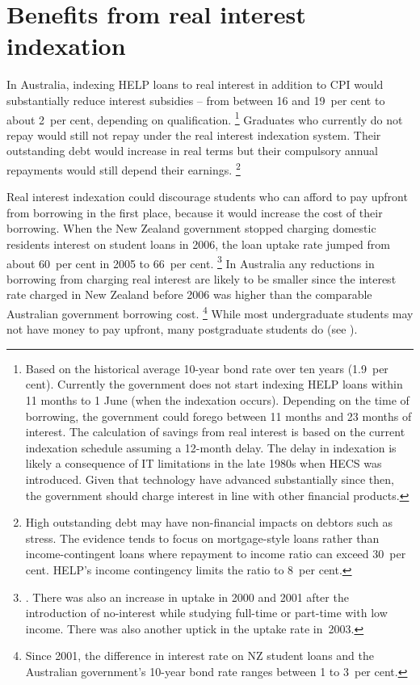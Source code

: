 \documentclass[embargoed]{grattan}
\begin{document}
\section{Benefits from real interest indexation}\label{benefits-from-real-interest-indexation}

In Australia, indexing \gls{HELP} loans to real interest in addition to \gls{CPI} would substantially reduce interest subsidies -- from between 16 and 19~per cent to about 2~per cent, depending on qualification.%
\footnote{Based on the historical average 10-year bond rate over ten years (1.9~per cent).\label{fn:68-High-outstanding-debt-non-fin-impact}
Currently the government does not start indexing \gls{HELP} loans within 11 months to 1 June (when the indexation occurs).
Depending on the time of borrowing, the government could forego between 11 months and 23 months of interest.
The calculation of savings from real interest is based on the current indexation schedule assuming a 12-month delay.
The delay in indexation is likely a consequence of IT limitations in the late 1980s when \gls{HECS} was introduced.
Given that technology have advanced substantially since then, the government should charge interest in line with other financial products.} Graduates who currently do not repay would still not repay under the real interest indexation system.
Their outstanding debt would increase in real terms but their compulsory annual repayments would still depend their earnings.%
\footnote{High outstanding debt may have non-financial impacts on debtors such as stress.
The evidence tends to focus on mortgage-style loans rather than income-contingent loans where repayment to income ratio can exceed 30~per cent.
\gls{HELP}'s income contingency limits the ratio to 8~per cent.}

Real interest indexation could discourage students who can afford to pay upfront from borrowing in the first place, because it would increase the cost of their borrowing.
When the New Zealand government stopped charging domestic residents interest on student loans in 2006, the loan uptake rate jumped from about 60~per cent in 2005 to 66~per cent.%
\footnote{\textcite[][23]{EducationNZ2013Studentloanscheme}. 
There was also an increase in uptake in 2000 and 2001 after the introduction of no-interest while studying full-time or part-time with low income.
There was also another uptick in the uptake rate in~2003.
} 
In Australia any reductions in borrowing from charging real interest are likely to be smaller since the interest rate charged in New Zealand before 2006 was higher than the comparable Australian government borrowing cost.%
\footnote{Since 2001, the difference in interest rate on NZ student loans and the Australian government's 10-year bond rate ranges between 1 to 3~per cent.} While most undergraduate students may not have money to pay upfront, many postgraduate students do (see ).
\end{document}
